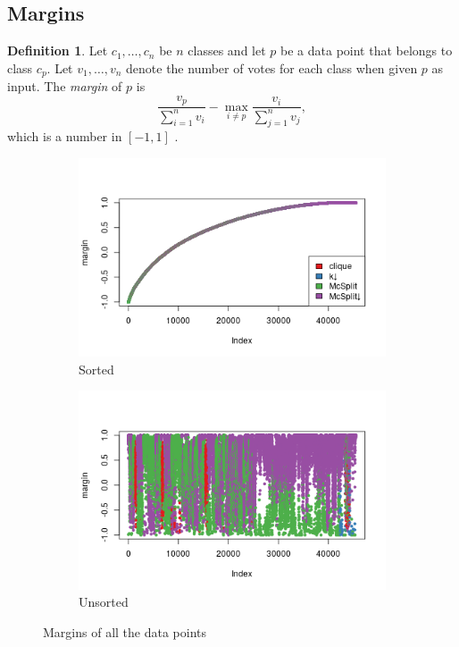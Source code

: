 \documentclass{l4proj}
\theoremstyle{definition}
\newtheorem{definition}{Definition}[chapter]
\theoremstyle{remark}
\begin{document}
\subsection{Margins}

\begin{definition}
  Let $c_1, \dots, c_n$ be $n$ classes and let $p$ be a data point that belongs
  to class $c_p$. Let $v_1, \dots, v_n$ denote the number of votes for each
  class when given $p$ as input. The \emph{margin} of $p$ is
  \[ \frac{v_p}{\sum_{i=1}^n v_i} - \max_{i \ne p} \frac{v_i}{\sum_{j=1}^n v_j}, \]
  which is a number in $[-1, 1]$ \cite{forest}.
\end{definition}

\begin{figure}
  \centering
  \begin{subfigure}[t]{0.49\textwidth}
    \centering
    \includegraphics[width=\textwidth]{images/unlabelled_margin.png}
    \caption{Sorted}
    \label{fig:unlabelled_margins1}
  \end{subfigure}
  \begin{subfigure}[t]{0.49\textwidth}
    \centering
    \includegraphics[width=\textwidth]{images/unlabelled_margin2.png}
    \caption{Unsorted}
    \label{fig:unlabelled_margins2}
  \end{subfigure}
  \caption{Margins of all the data points}
  \label{fig:unlabelled_margins}
\end{figure}
\end{document}
